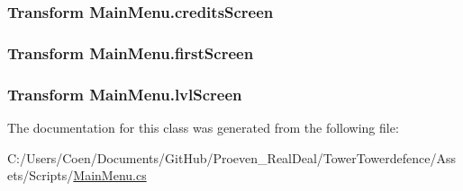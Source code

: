 \subsubsection[{\texorpdfstring{credits\+Screen}{creditsScreen}}]{\setlength{\rightskip}{0pt plus 5cm}Transform Main\+Menu.\+credits\+Screen}\hypertarget{class_main_menu_ab647109a373252337dbfbda3a2f93b75}{}\label{class_main_menu_ab647109a373252337dbfbda3a2f93b75}
\subsubsection[{\texorpdfstring{first\+Screen}{firstScreen}}]{\setlength{\rightskip}{0pt plus 5cm}Transform Main\+Menu.\+first\+Screen}\hypertarget{class_main_menu_af09082567bb61c7b9cffaca2034dc37b}{}\label{class_main_menu_af09082567bb61c7b9cffaca2034dc37b}
\subsubsection[{\texorpdfstring{lvl\+Screen}{lvlScreen}}]{\setlength{\rightskip}{0pt plus 5cm}Transform Main\+Menu.\+lvl\+Screen}\hypertarget{class_main_menu_a642b6ac70782065ff4dd315f1f811e36}{}\label{class_main_menu_a642b6ac70782065ff4dd315f1f811e36}


The documentation for this class was generated from the following file\+:\begin{DoxyCompactItemize}
\item 
C\+:/\+Users/\+Coen/\+Documents/\+Git\+Hub/\+Proeven\+\_\+\+Real\+Deal/\+Tower\+Towerdefence/\+Assets/\+Scripts/\hyperlink{_main_menu_8cs}{Main\+Menu.\+cs}\end{DoxyCompactItemize}

